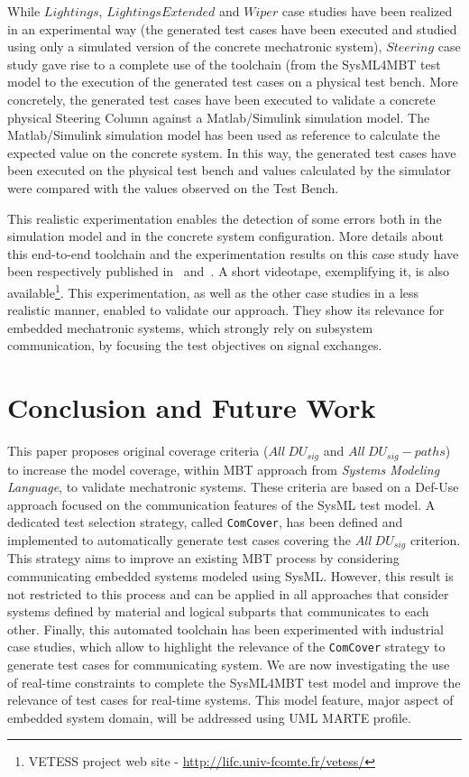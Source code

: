 \documentclass{llncs}
\begin{document}
While $Lightings$, $Lightings Extended$ and $Wiper$ case studies have
been realized in an experimental way (the generated test cases have
been executed and studied using only a simulated version of the concrete
mechatronic system), $Steering$ case study gave rise to a complete
use of the toolchain (from the SysML4MBT test model to the execution of 
the generated test cases on a physical test bench. More concretely, 
the generated test cases have been
executed to validate a concrete physical Steering Column against a
Matlab/Simulink simulation model.
The Matlab/Simulink simulation model has been used as reference to
calculate the expected value on the concrete system. In this way, the
generated test cases have been executed on the physical test bench and
values calculated by the simulator were compared with the values
observed on the Test Bench. 

This realistic experimentation enables the detection of some errors
both in the simulation model and in the concrete system configuration. More
details about this end-to-end toolchain and the experimentation results
on this case study have been respectively published in~\cite{LPG11} and~\cite{ABLLP12}. A short videotape, exemplifying it, is also 
available\footnote{VETESS project web site - \url{http://lifc.univ-fcomte.fr/vetess/}}. This
experimentation, as well as the other case studies in a less realistic
manner, enabled to validate our approach. They show its relevance for embedded 
mechatronic systems, which strongly
rely on subsystem communication, by focusing the test objectives on
signal exchanges.

\vspace*{-.3cm}
\section{Conclusion and Future Work}
\label{conclusion}
\vspace*{-.3cm}
This paper proposes original coverage criteria ($All~DU_{sig}$
and $All~DU_{sig}-paths$) to increase the model coverage, within MBT
approach from \textit{Systems Modeling Language}, to validate
mechatronic systems. These criteria are based on a Def-Use approach
focused on the communication features of the SysML test model. A
dedicated test selection strategy, called \texttt{ComCover}, has been
defined and implemented to automatically generate test cases covering
the $All~DU_{sig}$ criterion. This strategy aims to improve an
existing MBT process by considering communicating embedded systems
modeled using SysML. However, this result is
not restricted to this process and can be applied in all approaches
that consider systems defined by material and logical subparts that
communicates to each other. Finally, this automated toolchain has been
experimented with industrial case studies, which allow to highlight the 
relevance of the \texttt{ComCover} strategy to
generate test cases for  communicating system. 
We are now investigating the use of real-time constraints to complete
the SysML4MBT test model and improve the
relevance of test cases for real-time systems.
This model feature, major aspect of embedded system domain, will be
addressed using UML MARTE profile.  
\vspace*{-.3cm}

 
\end{document}
